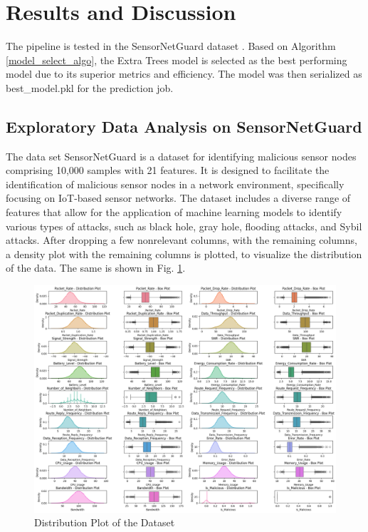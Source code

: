 \documentclass[runningheads]{llncs}
\begin{document}
\section{Results and Discussion}
\label{sec:Results-and-Discussion}

The pipeline is tested in the SensorNetGuard dataset \cite{b3}. Based on Algorithm \ref{model_select_algo}, the Extra Trees model is selected as the best performing model due to its superior metrics and efficiency. The model was then serialized as best\_model.pkl for the prediction job. 

\subsection{Exploratory Data Analysis on SensorNetGuard}
The data set SensorNetGuard is a dataset for identifying malicious sensor nodes comprising 10,000 samples with 21 features. It is designed to facilitate the identification of malicious sensor nodes in a network environment, specifically focusing on IoT-based sensor networks. The dataset includes a diverse range of features that allow for the application of machine learning models to identify various types of attacks, such as black hole, gray hole, flooding attacks, and Sybil attacks.
After dropping a few nonrelevant columns, with the remaining columns, a density plot with the remaining columns is plotted, to visualize the distribution of the data. The same is shown in Fig. \ref{fig:Distplot}. 

\begin{figure}[H]
\centerline{\includegraphics[width=0.95\linewidth]{images/download.png}}
\caption{Distribution Plot of the Dataset}
\label{fig:Distplot}
\end{figure}
\end{document}
